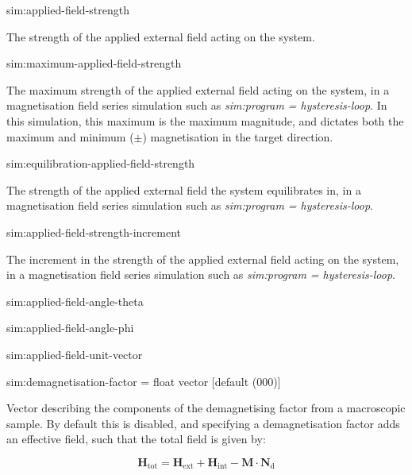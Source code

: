 {\zicf sim:applied-field-strength} The strength of the applied external field acting on the system.

{\zicf  sim:maximum-applied-field-strength}
The maximum strength of the applied external field acting on the system, in a magnetisation field series simulation such as \textit{sim:program = hysteresis-loop}. In this simulation, this maximum is the maximum magnitude, and dictates both the maximum and minimum ($\pm$) magnetisation in the target direction.

{\zicf sim:equilibration-applied-field-strength}
   The strength of the applied external field the system equilibrates in, in a magnetisation field series simulation such as \textit{sim:program = hysteresis-loop}.

{\zicf sim:applied-field-strength-increment}
   The increment in the strength of the applied external field acting on the system, in a magnetisation field series simulation such as \textit{sim:program = hysteresis-loop}.

{\zicf sim:applied-field-angle-theta}

{\zicf sim:applied-field-angle-phi}

{\zicf sim:applied-field-unit-vector}

{\zicf sim:demagnetisation-factor = float vector [default (000)]} Vector describing the components of the demagnetising factor from a macroscopic sample. By default this is disabled, and specifying a demagnetisation factor adds an effective field, such that the total field is given by:

\begin{equation*}
\mathbf{H}_{\mathrm{tot}} = \mathbf{H}_{\mathrm{ext}} + \mathbf{H}_{\mathrm{int}} - \mathbf{M} \cdot \mathbf{N}_{\mathrm{d}}
\end{equation*}

